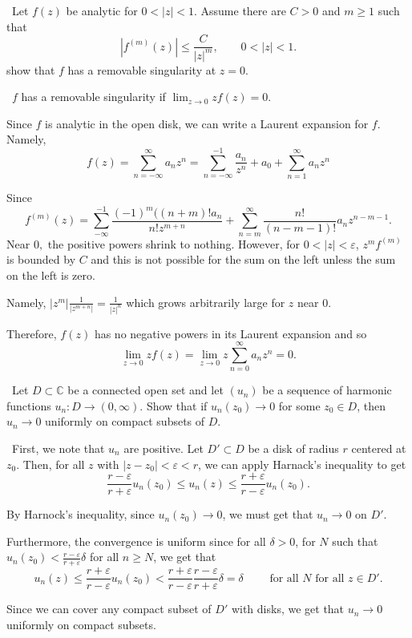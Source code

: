 \documentclass[12pt]{Qual}
\begin{document}
\begin{problem} $\,$
Let $f(z)$ be analytic for $0<|z|<1$. Assume there are $C>0$ and $m\ge1$ such that $$|f^{(m)}(z)|\le\frac{C}{|z|^m},\qquad 0<|z|<1.$$ show that $f$ has a removable singularity at $z=0.$
\end{problem}


\begin{solution}$\,$
$f$ has a removable singularity if $\lim_{z\to0}zf(z)=0.$

Since $f$ is analytic in the open disk, we can write a Laurent expansion for $f$. Namely, $$f(z)=\sum_{n=-\infty}^\infty a_nz^n=\sum_{n=-\infty}^{-1}\frac{a_n}{z^n}+a_0+\sum_{n=1}^\infty a_nz^n$$

Since $$f^{(m)}(z)=\sum_{-\infty}^{-1}\frac{(-1)^m((n+m)!a_n}{n!z^{m+n}}+\sum_{n=m}^\infty\frac{n!}{(n-m-1)!}a_nz^{n-m-1}.$$ Near $0,$ the positive powers shrink to nothing. However, for $0<|z|<\varepsilon$, $z^mf^{(m)}$ is bounded by $C$ and this is not possible for the sum on the left unless the sum on the left is zero.

Namely, $|z^m|\frac{1}{|z^{m+n}|}=\frac{1}{|z|^n}$ which grows arbitrarily large for $z$ near $0.$

Therefore, $f(z)$ has no negative powers in its Laurent expansion and so $$\lim_{z\to0}zf(z)=\lim_{z\to0}z\sum_{n=0}^\infty a_nz^n=0.$$

\end{solution}
\newpage



\begin{problem} $\,$
Let $D\subset\mathbb{C}$ be a connected open set and let $(u_n)$ be a sequence of harmonic functions $u_n:D\to(0,\infty).$ Show that if $u_n(z_0)\to0$ for some $z_0\in D$, then $u_n\to0$ uniformly on compact subsets of $D.$
\end{problem}


\begin{solution}$\,$
First, we note that $u_n$ are positive. Let $D'\subset D$ be a disk of radius $r$ centered at $z_0$. Then, for all $z$ with $|z-z_0|<\varepsilon<r$, we can apply Harnack's inequality to get $$\frac{r-\varepsilon}{r+\varepsilon}u_n(z_0)\le u_n(z)\le\frac{r+\varepsilon}{r-\varepsilon}u_n(z_0).$$

By Harnock's inequality, since $u_n(z_0)\to 0$, we must get that $u_n\to0$ on $D'.$

Furthermore, the convergence is uniform since for all $\delta>0$, for $N$ such that $u_n(z_0)< \frac{r-\varepsilon}{r+\varepsilon}\delta$ for all $n\ge N$, we get that $$u_n(z)\le\frac{r+\varepsilon}{r-\varepsilon}u_n(z_0)<\frac{r+\varepsilon}{r-\varepsilon}\frac{r-\varepsilon}{r+\varepsilon}\delta=\delta\qquad\text{ for all }N\text{ for all }z\in D'.$$

Since we can cover any compact subset of $D'$ with disks, we get that $u_n\to0$ uniformly on compact subsets.
\end{solution}
\newpage
\end{document}
